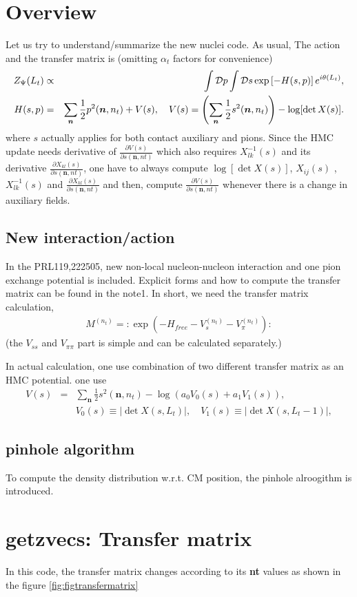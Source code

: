 \documentclass[10pt]{book}
\def\bm{\boldsymbol}
\newcommand{\bea}{\begin{eqnarray}}
\newcommand{\eea}{\end{eqnarray}}
\newcommand{\no}{\nonumber \\}
\newcommand{\del}{\partial}
\def\vn{{\bm n}}
\begin{document}
\section{Overview} 
Let us try to understand/summarize the new nuclei code. 
As usual, 
The action and the transfer matrix is (omitting $\alpha_t$ factors for convenience)
\bea
Z_\Psi(L_t) &\propto& \int{\cal D}p \int {\cal D} s \exp\left[-H(s,p) \right] e^{i\theta(L_t)}, \no 
H(s,p)&=&\sum_{\vn}\frac{1}{2} p^2(\vn,n_t)+V(s),\quad
V(s)=\left( \sum_{\vn}\frac{1}{2} s^2(\vn,n_t) \right)-\log[\det X(s)].
\eea
where $s$ actually applies for both contact auxiliary and pions. 
Since the HMC update needs derivative of $\frac{\del V(s)}{\del s(\vn,nt)}$ which 
also requires $X^{-1}_{lk}(s)$ and its derivative $\frac{\del X_{kl}(s)}{\del s(\vn,nt)}$,
one have to always compute $\log[\det X(s)]$, $X_{ij}(s)$ ,  $X^{-1}_{lk}(s)$
and $\frac{\del X_{kl}(s)}{\del s(\vn,nt)}$ and then, compute $\frac{\del V(s)}{\del s(\vn,nt)}$
whenever there is a change in auxiliary fields. 

\subsection{New interaction/action}
In the PRL119,222505, new non-local nucleon-nucleon interaction 
and one pion exchange potential is included. 
Explicit forms and how to compute the transfer matrix can be found in the note1. 
In short, we need the transfer matrix calculation,
\bea 
M^{(n_t)}=:\exp\left( -H_{free}-V_{s}^{(n_t)}-V_\pi^{(n_t)}\right):
\eea 
(the $V_{ss}$ and $V_{\pi\pi}$ part is simple and can be calculated separately.)

In actual calculation, one use combination of two different transfer matrix as
an HMC potential. 
one use
\bea 
V(s)&=&\sum_{\vn}\frac{1}{2}s^2(\vn,n_t)-\log\left( a_0 V_0(s) +a_1 V_1(s)  \right) ,\no 
& &V_0(s)\equiv |\det X(s,L_t)|,\quad  V_1(s)\equiv |\det X(s,L_t-1)|,
\eea 

\subsection{pinhole algorithm}
To compute the density distribution w.r.t. CM position,
the pinhole alroogithm is introduced. 

\section{getzvecs: Transfer matrix}  
In this code, the transfer matrix changes according to its {\bf nt} values
as shown in the figure \ref{fig:figtransfermatrix}
\end{document}
